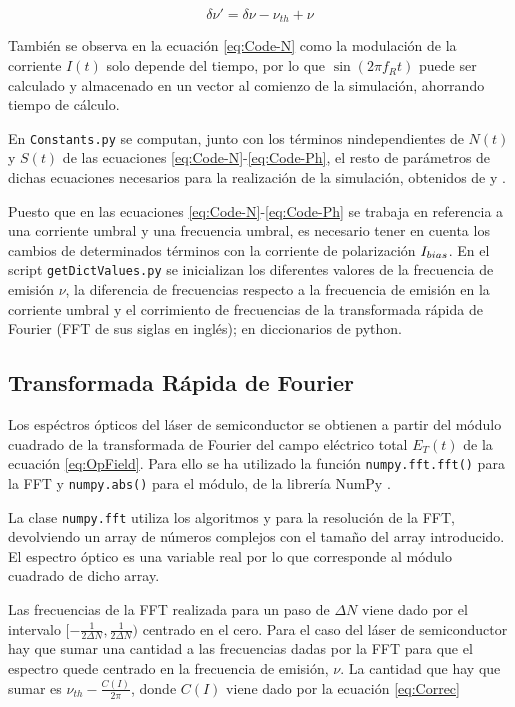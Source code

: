 			\begin{equation}
				\delta\nu' = \delta\nu - \nu_{th} + \nu
			\end{equation}

		Tambi\'en se observa en la ecuaci\'on \ref{eq:Code-N} como la modulaci\'on de la corriente $I(t)$ solo depende del tiempo, por lo que $\sin(2\pi f_R t)$ puede ser calculado y almacenado en un vector al comienzo de la simulaci\'on, ahorrando tiempo de c\'alculo.

		En \texttt{Constants.py} se computan, junto con los t\'erminos nindependientes de $N(t)$ y $S(t)$ de las ecuaciones \ref{eq:Code-N}-\ref{eq:Code-Ph}, el resto de par\'ametros de dichas ecuaciones necesarios para la realizaci\'on de la simulaci\'on, obtenidos de \cite{artSim} y \cite{Chaves19}.

		Puesto que en las ecuaciones \ref{eq:Code-N}-\ref{eq:Code-Ph} se trabaja en referencia a una corriente umbral y una frecuencia umbral, es necesario tener en cuenta los cambios de determinados t\'erminos con la corriente de polarización $I_{bias}$. En el script \texttt{getDictValues.py} se inicializan los diferentes valores de la frecuencia de emisión $\nu$, la diferencia de frecuencias respecto a la frecuencia de emisi\'on en la corriente umbral \cite{Chaves19} y el corrimiento de frecuencias de la transformada r\'apida de Fourier (FFT de sus siglas en ingl\'es); en diccionarios de python.

	\subsection{Transformada R\'apida de Fourier}
		\label{Mdl:Code:FFT}

		Los esp\'ectros \'opticos del l\'aser de semiconductor se obtienen a partir del m\'odulo cuadrado de la transformada de Fourier del campo el\'ectrico total $E_T(t)$ de la ecuaci\'on \ref{eq:OpField}. Para ello se ha utilizado la función \texttt{numpy.fft.fft()} para la FFT y \texttt{numpy.abs()} para el m\'odulo, de la librer\'ia NumPy \cite{numpy}.

		La clase \texttt{numpy.fft} utiliza los algoritmos \cite{numerical} y \cite{cooley1965algorithm} para la resoluci\'on de la FFT, devolviendo un array de n\'umeros complejos con el tamaño del array introducido. El espectro \'optico es una variable real por lo que corresponde al m\'odulo cuadrado de dicho array. 

		Las frecuencias de la FFT realizada para un paso de $\Delta N$ viene dado por el intervalo $[-\frac{1}{2\Delta N}, \frac{1}{2\Delta N})$ centrado en el cero. Para el caso del l\'aser de semiconductor hay que sumar una cantidad a las frecuencias dadas por la FFT para que el espectro quede centrado en la frecuencia de emisión, $\nu$. La cantidad que hay que sumar es $\nu_{th} - \frac{C(I)}{2\pi}$, donde $C(I)$ viene dado por la ecuación \ref{eq:Correc} %

